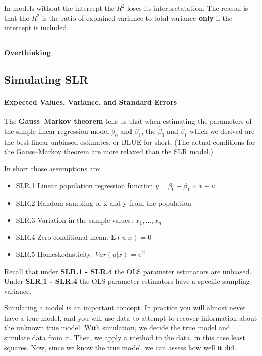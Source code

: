 \documentclass[]{book}
\providecommand{\tightlist}{%
  \setlength{\itemsep}{0pt}\setlength{\parskip}{0pt}}
\let\oldparagraph\paragraph
\renewcommand{\paragraph}[1]{\oldparagraph{#1}\mbox{}}
\begin{document}
In models without the intercept the \(R^2\) loses its interpretatation. The reason is that the \(R^2\) is the ratio of explained variance to total variance \textbf{only} if the intercept is included.

\begin{center}\rule{0.5\linewidth}{\linethickness}\end{center}

\textbf{Overthinking}

\hypertarget{simulating-slr}{%
\subsection{Simulating SLR}\label{simulating-slr}}

\hypertarget{expected-values-variance-and-standard-errors}{%
\paragraph{Expected Values, Variance, and Standard Errors}\label{expected-values-variance-and-standard-errors}}

The \textbf{Gauss--Markov theorem} tells us that when estimating the parameters of the simple linear regression model \(\beta_{0}\) and \(\beta_{1}\), the \(\hat{\beta}_{0}\) and \(\hat{\beta}_{1}\) which we derived are the best linear unbiased estimates, or BLUE for short. (The actual conditions for the Gauss--Markov theorem are more relaxed than the SLR model.)

In short those assumptions are:

\begin{itemize}
\tightlist
\item
  SLR.1 Linear population regression function \(y = \beta_0 + \beta_{1} \times x + u\)
\item
  SLR.2 Random sampling of x and y from the population\\
\item
  SLR.3 Variation in the sample values: \(x_{1}, \dots , x_{n}\)
\item
  SLR.4 Zero conditional mean: \(\mathbf{E}(u|x) = 0\)
\item
  SLR.5 Homeskedasticity: \(Var(u|x) = \sigma^2\)
\end{itemize}

Recall that under \textbf{SLR.1 - SLR.4} the OLS parameter estimators are unbiased. Under \textbf{SLR.1 - SLR.4} the OLS parameter estimators have a specific sampling variance.

Simulating a model is an important concept. In practice you will almost never have a true model, and you will use data to attempt to recover information about the unknown true model. With simulation, we decide the true model and simulate data from it. Then, we apply a method to the data, in this case least squares. Now, since we know the true model, we can assess how well it did.
\end{document}
